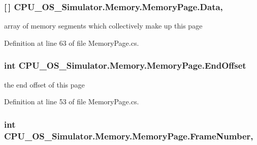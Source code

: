 \subsubsection[{Data}]{ \mbox{[}$\,$\mbox{]} C\+P\+U\+\_\+\+O\+S\+\_\+\+Simulator.\+Memory.\+Memory\+Page.\+Data\hspace{0.3cm}{\ttfamily [get]}, {\ttfamily [set]}}\label{class_c_p_u___o_s___simulator_1_1_memory_1_1_memory_page_a8bf84e82146f9ff35ffbcc32b93a9db0}


array of memory segments which collectively make up this page 



Definition at line 63 of file Memory\+Page.\+cs.

\hypertarget{class_c_p_u___o_s___simulator_1_1_memory_1_1_memory_page_abe850b4a088a820ecf598af1cd9a7deb}{}
\subsubsection[{End\+Offset}]{\setlength{\rightskip}{0pt plus 5cm}int C\+P\+U\+\_\+\+O\+S\+\_\+\+Simulator.\+Memory.\+Memory\+Page.\+End\+Offset\hspace{0.3cm}{\ttfamily [get]}}\label{class_c_p_u___o_s___simulator_1_1_memory_1_1_memory_page_abe850b4a088a820ecf598af1cd9a7deb}


the end offset of this page 



Definition at line 53 of file Memory\+Page.\+cs.

\hypertarget{class_c_p_u___o_s___simulator_1_1_memory_1_1_memory_page_a89857b70d4065fdc15ce2ea577a7f0ff}{}
\subsubsection[{Frame\+Number}]{\setlength{\rightskip}{0pt plus 5cm}int C\+P\+U\+\_\+\+O\+S\+\_\+\+Simulator.\+Memory.\+Memory\+Page.\+Frame\+Number\hspace{0.3cm}{\ttfamily [get]}, {\ttfamily [set]}}\label{class_c_p_u___o_s___simulator_1_1_memory_1_1_memory_page_a89857b70d4065fdc15ce2ea577a7f0ff}


